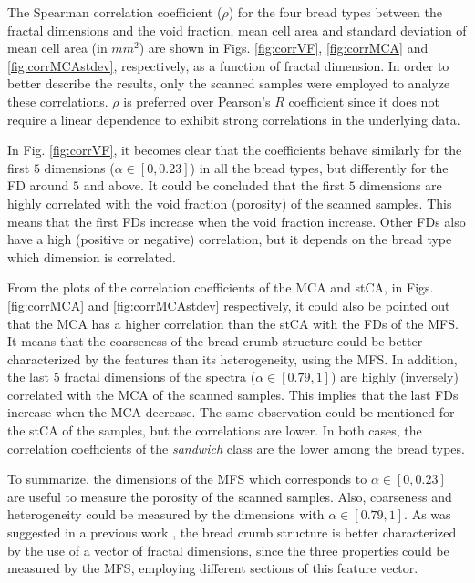 The Spearman correlation coefficient ($\rho$) for the four bread types between the fractal dimensions and the void fraction, mean cell area and standard deviation of mean cell area (in $mm^{2}$) are shown in Figs. \ref{fig:corrVF}, \ref{fig:corrMCA} and \ref{fig:corrMCAstdev}, respectively, as a function of fractal dimension. In order to better describe the results, only the scanned samples were employed to analyze these correlations. $\rho$ is preferred over Pearson's $R$ coefficient since it does not require a linear dependence to exhibit strong correlations in the underlying data.

In Fig. \ref{fig:corrVF}, it becomes clear that the coefficients behave similarly for the first $5$ dimensions ($\alpha \in [0,0.23]$) in all the bread types, but differently for the FD around $5$ and above. It could be concluded that the first $5$ dimensions are highly correlated with the void fraction (porosity) of the scanned samples. This means that the first FDs increase when the void fraction increase. Other FDs also have a high (positive or negative) correlation, but it depends on the bread type which dimension is correlated.

From the plots of the correlation coefficients of the MCA and stCA, in Figs. \ref{fig:corrMCA} and \ref{fig:corrMCAstdev} respectively, it could also be pointed out that the MCA has a higher correlation than the stCA with the FDs of the MFS. It means that the coarseness of the bread crumb structure could be better characterized by the features than its heterogeneity, using the MFS. In addition, the last $5$ fractal dimensions of the spectra ($\alpha \in [0.79,1]$) are highly (inversely) correlated with the MCA of the scanned samples. This implies that the last FDs increase when the MCA decrease. The same observation could be mentioned for the stCA of the samples, but the correlations are lower. In both cases, the correlation coefficients of the {\em sandwich} class are the lower among the bread types.

To summarize, the dimensions of the MFS which corresponds to $\alpha \in [0,0.23]$ are useful to measure the porosity of the scanned samples. Also, coarseness and heterogeneity could be measured by the dimensions with $\alpha \in [0.79,1]$. As was suggested in a previous work \cite{Gonzales2008}, the bread crumb structure is better characterized by the use of a vector of fractal dimensions, since the three properties could be measured by the MFS, employing different sections of this feature vector.

